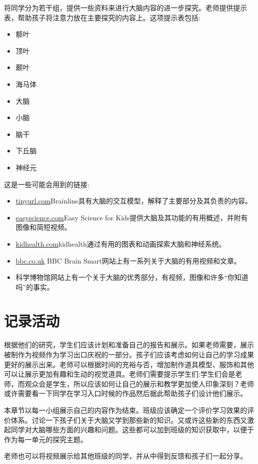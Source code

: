       将同学分为若干组，提供一些资料来进行大脑内容的进一步探究。老师提供提示表，帮助孩子将注意力放在主要探究的内容上。这项提示表包括:\par
      \begin{itemize}
        \item 额叶
        \item 顶叶
        \item 颞叶
        \item 海马体
        \item 大脑  
        \item 小脑
        \item 脑干
        \item 下丘脑
        \item 神经元
      \end{itemize}  
      这是一些可能会用到的链接:\par
      \begin{itemize}
        \item \href{http://tinyurl.com/odp7ht3}{tinyurl.com}Brainline具有大脑的交互模型，解释了主要部分及其负责的内容。
        \item \href{http://easyscienceforkids.com/all-about-your-amazing-brain/}{easyscience.com}Easy Science for Kids提供大脑及其功能的有用概述，并附有图像和简短视频。
        \item \href{http://kidshealth.org/kid/htbw/brain.html}{kidhealth.com}kidhealth通过有用的图表和动画探索大脑和神经系统。
        \item \href{http://www.bbc.co.uk/scotland/brainsmart/brain/}{bbc.co.uk}  BBC Brain Smart网站上有一系列关于大脑的有用视频和文章。
        \item {}科学博物馆网站上有一个关于大脑的优秀部分，有视频，图像和许多“你知道吗”的事实。

      \end{itemize}  




\section{记录活动}
     根据他们的研究，学生们应该计划和准备自己的报告和展示。如果老师需要，展示被制作为视频作为学习出口庆祝的一部分。孩子们应该考虑如何让自己的学习成果更好的展示出来。老师可以根据时间的充裕与否，增加制作道具模型、服饰和其他可以让展示更加有趣和生动的视觉道具。老师们需要提示学生们:学生们会是老师，而观众会是学生，所以应该如何让自己的展示和教学更加使人印象深刻？老师或许需要看一下同学在学习入口时候的作品然后据此帮助孩子们设计他们展示。\par
     本章节以每一小组展示自己的内容作为结束。班级应该确定一个评价学习效果的评价体系。讨论一下孩子们关于大脑又学到那些新的知识。又或许这些新的东西又激起同学对大脑哪些方面的兴趣和问题。这些都可以加到班级的知识获取中，以便于作为每一单元的探究主题。\par
     老师也可以将视频展示给其他班级的同学，并从中得到反馈和孩子们一起分享。\par
